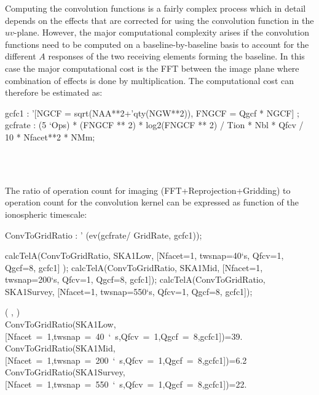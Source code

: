 \documentclass[useAMS,usenatbib,referee]{article}
\begin{document}
Computing the convolution functions is a fairly complex process which
in detail depends on the effects that are corrected for using the
convolution function in the $uv$-plane. However, the major
computational complexity arises if the convolution functions need to
be computed on a baseline-by-baseline basis to account for the
different $A$ responses of the two receiving elements forming the
baseline.  In this case the major computational cost is the FFT
between the image plane where combination of effects is done by
multiplication.  The computational cost can therefore be estimated as:

\begin{maxima}[]
gcfc1 : '[NGCF = sqrt(NAA**2+'qty(NGW**2)),
         FNGCF = Qgcf * NGCF] ;
gcfrate : (5 `Ops) *  (FNGCF ** 2) * log2(FNGCF ** 2)  / Tion * Nbl *
Qfcv / 10 *
Nfacet**2 * NMm;


\maximaoutput*
\m  \left[ \mathrm{NGCF}=\sqrt{\mathrm{qty}\left(N_{\rm GW}^2\right)+N_{\rm AA}^2} , \mathrm{FNGCF}=\mathrm{Qgcf}\,\mathrm{NGCF} \right] \\
\; \\
\end{maxima}

The ratio of operation count for imaging (FFT+Reprojection+Gridding)
to operation count for the convolution kernel can be expressed as
function of the ionospheric timescale:

\begin{maxima}[]

ConvToGridRatio : ' (ev(gcfrate/ GridRate, gcfc1));

calcTelA(ConvToGridRatio, SKA1Low, [Nfacet=1, twsnap=40`s, Qfcv=1, Qgcf=8, gcfc1] );
calcTelA(ConvToGridRatio, SKA1Mid, [Nfacet=1, twsnap=200`s, Qfcv=1, Qgcf=8, gcfc1]);
calcTelA(ConvToGridRatio, SKA1Survey, [Nfacet=1, twsnap=550`s, Qfcv=1, Qgcf=8, gcfc1]);

\maximaoutput*
\m  {}\left({{}} , \right) \\
\m  \mbox{{}ConvToGridRatio(SKA1Low,[Nfacet = 1,twsnap = 40 ` s,Qfcv = 1,Qgcf = 8,gcfc1]){}}={{39.}}\; \\
\m  \mbox{{}ConvToGridRatio(SKA1Mid,[Nfacet = 1,twsnap = 200 ` s,Qfcv = 1,Qgcf = 8,gcfc1]){}}={{6.2}}\; \\
\m  \mbox{{}ConvToGridRatio(SKA1Survey,[Nfacet = 1,twsnap = 550 ` s,Qfcv = 1,Qgcf = 8,gcfc1]){}}={{22.}}\; \\
\end{maxima}
\end{document}
